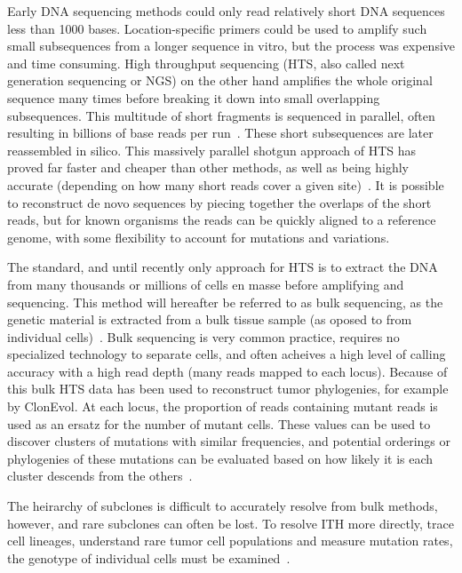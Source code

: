 \documentclass[../../main.tex]{subfiles}
\begin{document}
Early DNA sequencing methods could only read relatively short DNA sequences less than 1000 bases.
Location-specific primers could be used to amplify such small subsequences from a longer sequence in vitro, but the process was expensive and time consuming.
High throughput sequencing (HTS, also called next generation sequencing or NGS) on the other hand amplifies the whole original sequence many times before breaking it down into small overlapping subsequences.
This multitude of short fragments is sequenced in parallel, often resulting in billions of base reads per run~\cite{sequencesequencers}.
These short subsequences are later reassembled in silico.
This massively parallel shotgun approach of HTS has proved far faster and cheaper than other methods, as well as being highly accurate (depending on how many short reads cover a given site)~\cite{massivelyparallel}.
It is possible to reconstruct de novo sequences by piecing together the overlaps of the short reads, but for known organisms the reads can be quickly aligned to a reference genome, with some flexibility to account for mutations and variations.

The standard, and until recently only approach for HTS is to extract the DNA from many thousands or millions of cells en masse before amplifying and sequencing.
This method will hereafter be referred to as bulk sequencing, as the genetic material is extracted from a bulk tissue sample (as oposed to from individual cells)~\cite{SCSadvance}.
Bulk sequencing is very common practice, requires no specialized technology to separate cells, and often acheives a high level of calling accuracy with a high read depth (many reads mapped to each locus).
Because of this bulk HTS data has been used to reconstruct tumor phylogenies, for example by ClonEvol.
At each locus, the proportion of reads containing mutant reads is used as an ersatz for the number of mutant cells.
These values can be used to discover clusters of mutations with similar frequencies, and potential orderings or phylogenies of these mutations can be evaluated based on how likely it is each cluster descends from the others~\cite{clonevol}.

The heirarchy of subclones is difficult to accurately resolve from bulk methods, however, and rare subclones can often be lost.
To resolve ITH more directly, trace cell lineages, understand rare tumor cell populations and measure mutation rates, the genotype of individual cells must be examined~\cite{onecelltime}.
\end{document}
